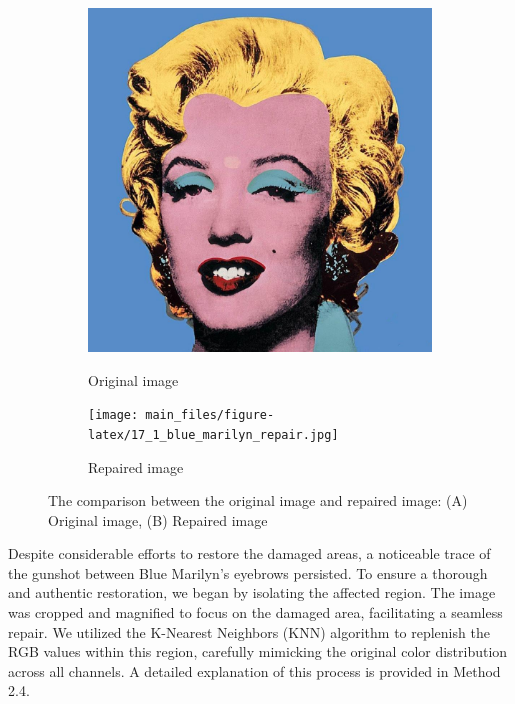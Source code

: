 \documentclass{article}
\begin{document}
\begin{figure}[h!]
    \centering
    \begin{subfigure}[b]{0.45\textwidth}
        \centering
        {\includegraphics[width=\textwidth]{main_files/figure-latex/1_4_blue_marilyn.jpg}}
        \caption{Original image}
        \label{fig:original_image}
    \end{subfigure}
    \hfill
    \begin{subfigure}[b]{0.45\textwidth}
        \centering
        {\texttt{[image: main\_files/figure-latex/17\_1\_blue\_marilyn\_repair.jpg]}}
        \caption{Repaired image}
        \label{fig:repaired_image}
    \end{subfigure}
    \caption{The comparison between the original image and repaired image: (A) Original image, (B) Repaired image}
    \label{fig:comparison_images}
\end{figure}

Despite considerable efforts to restore the damaged areas, a noticeable
trace of the gunshot between Blue Marilyn's eyebrows persisted. To
ensure a thorough and authentic restoration, we began by isolating the
affected region. The image was cropped and magnified to focus on the
damaged area, facilitating a seamless repair. We utilized the K-Nearest
Neighbors (KNN) algorithm to replenish the RGB values within this
region, carefully mimicking the original color distribution across all
channels. A detailed explanation of this process is provided in Method
2.4.
\end{document}
